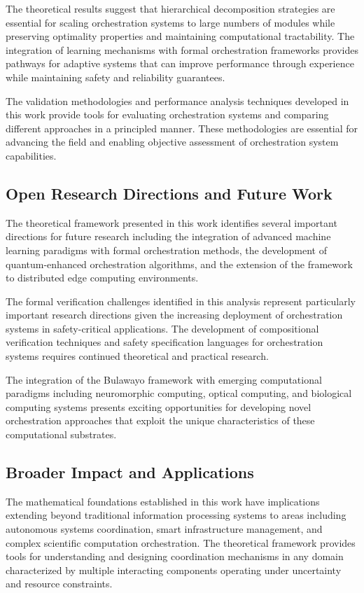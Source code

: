 \documentclass[12pt,a4paper]{article}
\begin{document}
{{{The theoretical results suggest that hierarchical decomposition strategies are essential for scaling orchestration systems to large numbers of modules while preserving optimality properties and maintaining computational tractability. The integration of learning mechanisms with formal orchestration frameworks provides pathways for adaptive systems that can improve performance through experience while maintaining safety and reliability guarantees.

The validation methodologies and performance analysis techniques developed in this work provide tools for evaluating orchestration systems and comparing different approaches in a principled manner. These methodologies are essential for advancing the field and enabling objective assessment of orchestration system capabilities.

\subsection{Open Research Directions and Future Work}

The theoretical framework presented in this work identifies several important directions for future research including the integration of advanced machine learning paradigms with formal orchestration methods, the development of quantum-enhanced orchestration algorithms, and the extension of the framework to distributed edge computing environments.

The formal verification challenges identified in this analysis represent particularly important research directions given the increasing deployment of orchestration systems in safety-critical applications. The development of compositional verification techniques and safety specification languages for orchestration systems requires continued theoretical and practical research.

The integration of the Bulawayo framework with emerging computational paradigms including neuromorphic computing, optical computing, and biological computing systems presents exciting opportunities for developing novel orchestration approaches that exploit the unique characteristics of these computational substrates.

\subsection{Broader Impact and Applications}

The mathematical foundations established in this work have implications extending beyond traditional information processing systems to areas including autonomous systems coordination, smart infrastructure management, and complex scientific computation orchestration. The theoretical framework provides tools for understanding and designing coordination mechanisms in any domain characterized by multiple interacting components operating under uncertainty and resource constraints.

}}}
\end{document}
